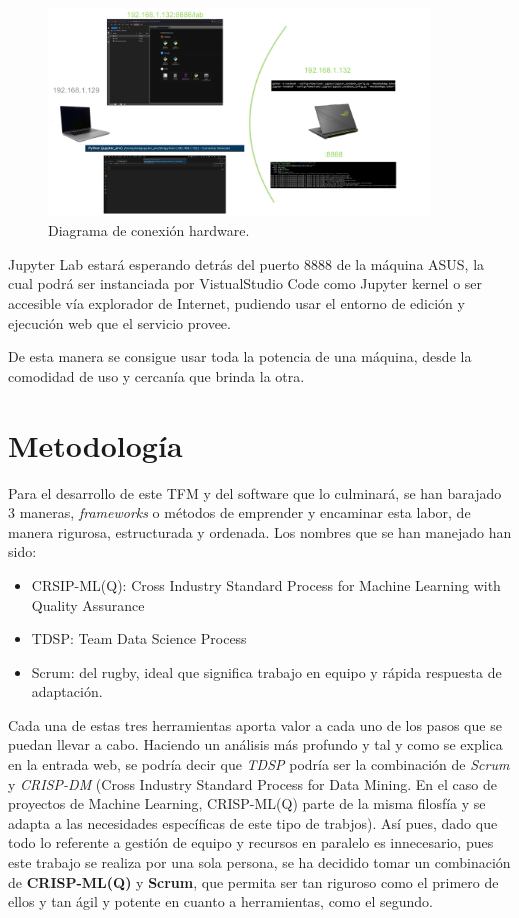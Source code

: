 \begin{figure}[H]
\centering
\includegraphics[width=0.9\textwidth]{images/jupyter-diagram.png}
\caption{Diagrama de conexión hardware.}
\label{fig:jupyter-diagram}
\end{figure}

Jupyter Lab estará esperando detrás del puerto 8888 de la máquina ASUS, la cual podrá ser instanciada por VistualStudio Code como Jupyter kernel o ser accesible vía explorador de Internet, pudiendo usar el entorno de edición y ejecución web que el servicio provee.

De esta manera se consigue usar toda la potencia de una máquina, desde la comodidad de uso y cercanía que brinda la otra.

\section{Metodología}

Para el desarrollo de este TFM y del software que lo culminará, se han barajado 3 maneras, \emph{frameworks} o métodos de emprender y encaminar esta labor, de manera rigurosa, estructurada y ordenada. Los nombres que se han manejado han sido:
\begin{itemize}
    \item CRSIP-ML(Q): Cross Industry Standard Process for Machine Learning with Quality Assurance
    \item TDSP: Team Data Science Process
    \item Scrum: del rugby, ideal que significa trabajo en equipo y rápida respuesta de adaptación.
\end{itemize}

Cada una de estas tres herramientas aporta valor a cada uno de los pasos que se puedan llevar a cabo. Haciendo un análisis más profundo y tal y como se explica en la entrada web\cite{TDSP-PM}, se podría decir que \emph{TDSP} podría ser la combinación de \emph{Scrum} y \emph{CRISP-DM} (Cross Industry Standard Process for Data Mining. En el caso de proyectos de Machine Learning, CRISP-ML(Q) parte de la misma filosfía y se adapta a las necesidades específicas de este tipo de trabjos). Así pues, dado que todo lo referente a gestión de equipo y recursos en paralelo es innecesario, pues este trabajo se realiza por una sola persona, se ha decidido tomar un combinación de \textbf{CRISP-ML(Q)} y \textbf{Scrum}, que permita ser tan riguroso como el primero de ellos y tan ágil y potente en cuanto a herramientas, como el segundo.

